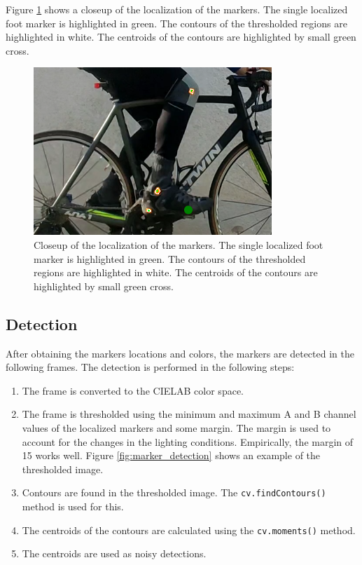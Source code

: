 Figure \ref{fig:marker_crop} shows a closeup of the localization of the markers. The single localized foot marker is highlighted in green. The contours of the thresholded regions are highlighted in white. The centroids of the contours are highlighted by small green cross.
\begin{figure}[htbp]
    \centering
    \includegraphics[width=\textwidth]{obrazky-figures/markers_crop.png}
    \caption{Closeup of the localization of the markers. The single localized foot marker is highlighted in green. The contours of the thresholded regions are highlighted in white. The centroids of the contours are highlighted by small green cross.}
    \label{fig:marker_crop}
\end{figure}

\subsection{Detection}
\label{detection}
After obtaining the markers locations and colors, the markers are detected in the following frames. The detection is performed in the following steps:
\begin{enumerate}
    \item The frame is converted to the CIELAB color space.
    \item The frame is thresholded using the minimum and maximum A and B channel values of the localized markers and some margin. The margin is used to account for the changes in the lighting conditions. Empirically, the margin of 15 works well. Figure \ref{fig:marker_detection} shows an example of the thresholded image.
    \item Contours are found in the thresholded image. The \texttt{cv.findContours()} method is used for this.
    \item The centroids of the contours are calculated using the \texttt{cv.moments()} method.
    \item The centroids are used as noisy detections.
\end{enumerate}

